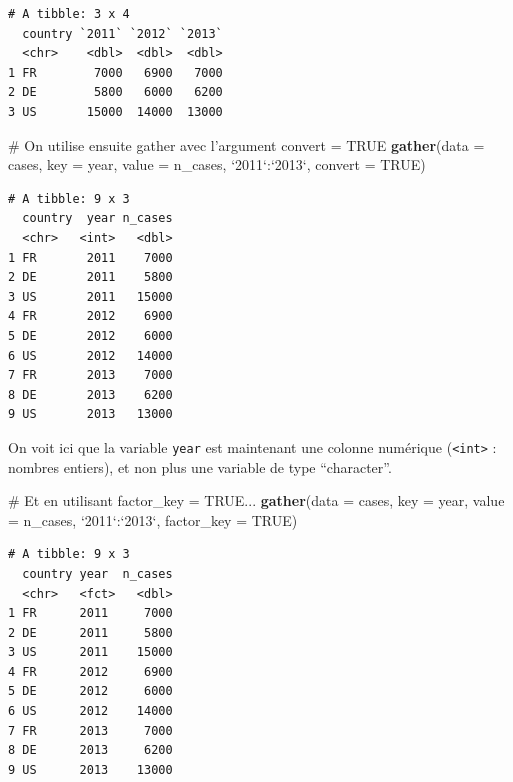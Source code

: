 \documentclass[a4paperpaper,]{article}
\newenvironment{Shaded}{\begin{snugshade}}{\end{snugshade}}
\newcommand{\CommentTok}[1]{\textcolor[rgb]{0.54,0.53,0.53}{#1}}
\newcommand{\DataTypeTok}[1]{\textcolor[rgb]{0.00,0.34,0.68}{#1}}
\newcommand{\KeywordTok}[1]{\textcolor[rgb]{0.12,0.11,0.11}{\textbf{#1}}}
\newcommand{\NormalTok}[1]{\textcolor[rgb]{0.12,0.11,0.11}{#1}}
\newcommand{\OperatorTok}[1]{\textcolor[rgb]{0.12,0.11,0.11}{#1}}
\newcommand{\OtherTok}[1]{\textcolor[rgb]{0.00,0.43,0.16}{#1}}
\newcommand{\StringTok}[1]{\textcolor[rgb]{0.75,0.01,0.01}{#1}}
\begin{document}
\begin{verbatim}
# A tibble: 3 x 4
  country `2011` `2012` `2013`
  <chr>    <dbl>  <dbl>  <dbl>
1 FR        7000   6900   7000
2 DE        5800   6000   6200
3 US       15000  14000  13000
\end{verbatim}

\begin{Shaded}
\begin{Highlighting}[]
\CommentTok{# On utilise ensuite gather avec l'argument convert = TRUE}
\KeywordTok{gather}\NormalTok{(}\DataTypeTok{data =}\NormalTok{ cases, }\DataTypeTok{key =}\NormalTok{ year, }\DataTypeTok{value =}\NormalTok{ n_cases, }\StringTok{`}\DataTypeTok{2011}\StringTok{`}\OperatorTok{:}\StringTok{`}\DataTypeTok{2013}\StringTok{`}\NormalTok{, }\DataTypeTok{convert =} \OtherTok{TRUE}\NormalTok{)}
\end{Highlighting}
\end{Shaded}

\begin{verbatim}
# A tibble: 9 x 3
  country  year n_cases
  <chr>   <int>   <dbl>
1 FR       2011    7000
2 DE       2011    5800
3 US       2011   15000
4 FR       2012    6900
5 DE       2012    6000
6 US       2012   14000
7 FR       2013    7000
8 DE       2013    6200
9 US       2013   13000
\end{verbatim}

On voit ici que la variable \texttt{year} est maintenant une colonne numérique (\texttt{\textless{}int\textgreater{}} : nombres entiers), et non plus une variable de type ``character''.

\begin{Shaded}
\begin{Highlighting}[]
\CommentTok{# Et en utilisant factor_key = TRUE...}
\KeywordTok{gather}\NormalTok{(}\DataTypeTok{data =}\NormalTok{ cases, }\DataTypeTok{key =}\NormalTok{ year, }\DataTypeTok{value =}\NormalTok{ n_cases, }\StringTok{`}\DataTypeTok{2011}\StringTok{`}\OperatorTok{:}\StringTok{`}\DataTypeTok{2013}\StringTok{`}\NormalTok{, }\DataTypeTok{factor_key =} \OtherTok{TRUE}\NormalTok{)}
\end{Highlighting}
\end{Shaded}

\begin{verbatim}
# A tibble: 9 x 3
  country year  n_cases
  <chr>   <fct>   <dbl>
1 FR      2011     7000
2 DE      2011     5800
3 US      2011    15000
4 FR      2012     6900
5 DE      2012     6000
6 US      2012    14000
7 FR      2013     7000
8 DE      2013     6200
9 US      2013    13000
\end{verbatim}
\end{document}
